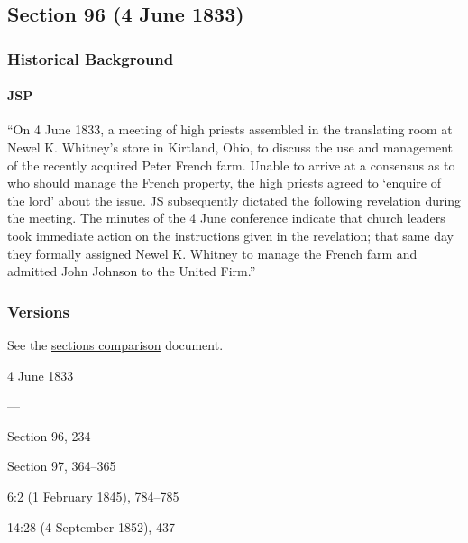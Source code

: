 \subsection{Section 96 (4 June 1833)}
	\label{DC96}
	
	\subsubsection{Historical Background}
		\label{DC96-HB}
		
		\paragraph{JSP}
		
			``On 4 June 1833, a meeting of high priests assembled in the translating room at Newel K. Whitney's store in Kirtland, Ohio, to discuss the use and management of the recently acquired Peter French farm. Unable to arrive at a consensus as to who should manage the French property, the high priests agreed to `enquire of the lord' about the issue. JS subsequently dictated the following revelation during the meeting. The minutes of the 4 June conference indicate that church leaders took immediate action on the instructions given in the revelation; that same day they formally assigned Newel K. Whitney to manage the French farm and admitted John Johnson to the United Firm.''
			
	\subsubsection{Versions}
		\label{DC96-V}
		
		See the \href{https://drive.google.com/file/d/1goAvNz8jS4R8slYfMG_db55Ty2z_vmgK/view?usp=sharing}{sections comparison} document.
	
		\begin{compactdesc}
			\item[JSP] \hyperref[EMS-1833-JS-4-JUN-1833]{4 June 1833}
			\item[BC] ---
			\item[DC 1835] Section 96, 234
			\item[DC 1844] Section 97, 364--365
			\item[TS] 6:2 (1 February 1845), 784--785
			\item[MS] 14:28 (4 September 1852), 437
		\end{compactdesc}

